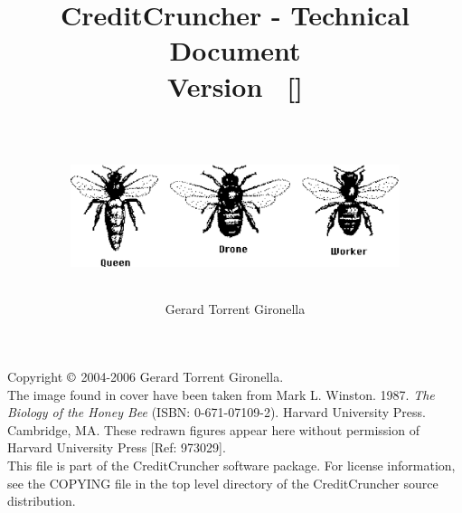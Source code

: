 
%
%
%
%
%
%
%
%
%

\title{CreditCruncher - Technical Document \\
Version \numversion\ {\small[\svnversion]}\\
\ \\
\centerline{\includegraphics[height=3cm, angle=0]{./images/threebees.eps}}
}

\author{Gerard Torrent Gironella}

\maketitle

\thispagestyle{empty}

\newpage

\vspace*{6in}

\noindent Copyright $\copyright$ 2004-2006 Gerard Torrent Gironella.\\

\noindent The image found in cover have been taken from Mark L. Winston. 1987.
\emph{The Biology of the Honey Bee} (ISBN: 0-671-07109-2). Harvard University
Press. Cambridge, MA. These redrawn figures appear here without permission of
Harvard University Press [Ref: 973029].\\

\noindent This file is part of the CreditCruncher software package.  For
license information, see the COPYING file in the top level directory
of the CreditCruncher source distribution.
